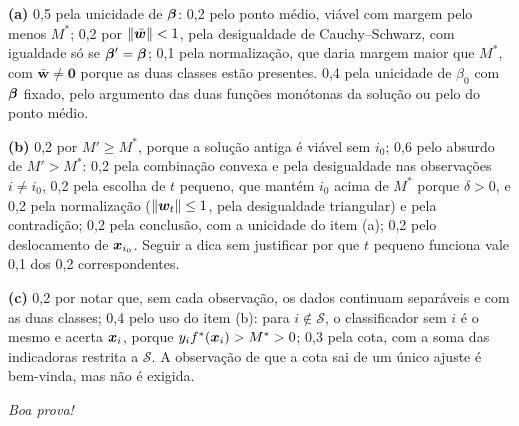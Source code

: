 \documentclass[11pt,a4paper]{article}
\begin{document}
\begin{criterio}
\textbf{(a)} 0,5 pela unicidade de $\bm{\beta}$: 0,2 pelo ponto médio, viável com margem pelo
menos $M^*$; 0,2 por $\left\lVert \bar{\bm w} \right\rVert<1$, pela desigualdade de Cauchy--Schwarz, com
igualdade só se $\bm{\beta}'=\bm{\beta}$; 0,1 pela normalização, que daria margem maior que
$M^*$, com $\bar{\bm w}\ne\bm0$ porque as duas classes estão presentes. 0,4 pela
unicidade de $\beta_0$ com $\bm{\beta}$ fixado, pelo argumento das duas funções monótonas da
solução ou pelo do ponto médio.

\textbf{(b)} 0,2 por $M'\ge M^*$, porque a solução antiga é viável sem $i_0$; 0,6 pelo
absurdo de $M'>M^*$: 0,2 pela combinação convexa e pela desigualdade nas observações
$i\ne i_0$, 0,2 pela escolha de $t$ pequeno, que mantém $i_0$ acima de $M^*$ porque
$\delta>0$, e 0,2 pela normalização ($\left\lVert \bm w_t \right\rVert\le1$, pela desigualdade
triangular) e pela contradição; 0,2 pela conclusão, com a unicidade do item (a); 0,2 pelo
deslocamento de $\bm{x}_{i_0}$. Seguir a dica sem justificar por que $t$ pequeno funciona
vale 0,1 dos 0,2 correspondentes.

\textbf{(c)} 0,2 por notar que, sem cada observação, os dados continuam separáveis e
com as duas classes; 0,4 pelo uso do item (b): para $i\notin\mathcal S$, o
classificador sem $i$ é o mesmo e acerta $\bm{x}_i$, porque $y_if^*(\bm{x}_i)>M^*>0$; 0,3 pela
cota, com a soma das indicadoras restrita a $\mathcal S$. A observação de que a cota sai
de um único ajuste é bem-vinda, mas não é exigida.
\end{criterio}

\vfill
\begin{center}\small\itshape Boa prova!\end{center}
\end{document}
